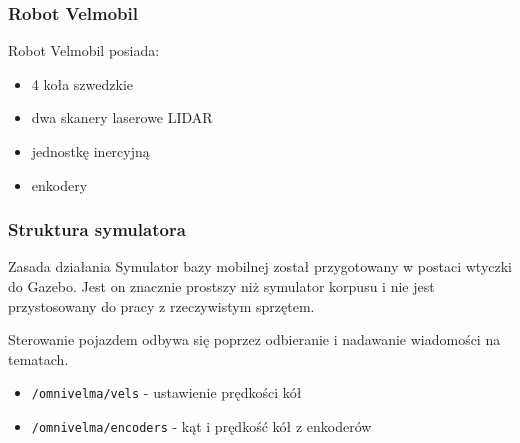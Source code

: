 \begin{frame}
\frametitle{Robot Velmobil}
Robot Velmobil posiada:  
\begin{itemize}
	\item 4 koła szwedzkie
	\item dwa skanery laserowe LIDAR
	\item jednostkę inercyjną
	\item enkodery %
\end{itemize}
\end{frame}


\begin{frame}
\frametitle{Struktura symulatora}
\begin{block}{Zasada działania}
Symulator bazy mobilnej został przygotowany w postaci wtyczki do Gazebo. 
Jest on znacznie prostszy niż symulator korpusu i nie jest przystosowany
do pracy z rzeczywistym sprzętem.
\end{block}
\bigskip
Sterowanie pojazdem
odbywa się poprzez odbieranie i nadawanie wiadomości na tematach.
\begin{itemize}
	\item \texttt{/omnivelma/vels} - ustawienie prędkości kół
	\item \texttt{/omnivelma/encoders} - kąt i prędkość kół z enkoderów
\end{itemize}
\end{frame}